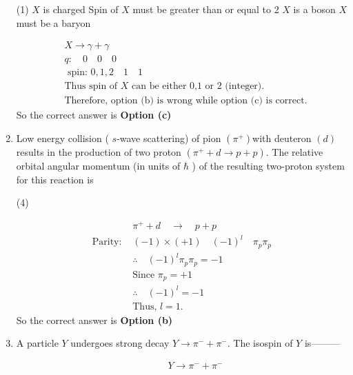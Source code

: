 \begin{enumerate}
{}
	 \begin{tasks}(1)
		\task[\textbf{a.}] $X$ is charged
		\task[\textbf{b.}]Spin of $X$ must be greater than or equal to 2
		\task[\textbf{c.}]$X$ is a boson
		\task[\textbf{d.}]$X$ must be a baryon 
	\end{tasks}
\begin{answer}
	\begin{align*}
	&X \rightarrow \gamma+\gamma\\
	&q: \quad 0 \quad 0 \quad 0\\
&\text{	spin: }0,1,2 \quad 1 \quad 1\\
	&\text{Thus spin of $X$ can be either 0,1 or 2 (integer).}\\
	&\text{Therefore, option (b) is wrong while option (c) is correct.}
	\end{align*}
	So the correct answer is \textbf{Option (c)}
\end{answer}
	\item  Low energy collision ( $s$-wave scattering) of pion $\left(\pi^{+}\right)$with deuteron $(d)$ results in the production of two proton $\left(\pi^{+}+d \rightarrow p+p\right)$. The relative orbital angular momentum (in units of $\hbar$ ) of the resulting two-proton system for this reaction is
	{}
	 \begin{tasks}(4)
	\end{tasks}
\begin{answer}
	\begin{align*}
	&\pi^{+}+d \quad \rightarrow \quad p+p\\
	\text{Parity: }&(-1) \times(+1) \quad(-1)^l \quad \pi_p \pi_p\\ &\therefore\quad (-1)^l \pi_p \pi_p=-1\\
	&\text{Since }\pi_p=+1\\
	&\therefore\quad (-1)^l=-1\\
	&\text{Thus, }l=1.
	\end{align*}
	So the correct answer is \textbf{Option (b)}
\end{answer}
	\item  A particle $Y$ undergoes strong decay $Y \rightarrow \pi^{-}+\pi^{-}$. The isospin of $Y$ is---------
	{}
	\begin{answer}
		\begin{align*}
		 &\quad \quad  Y \rightarrow \pi^{-}+\pi^{-}\\

\end{align*}
\end{answer}
\end{enumerate}
